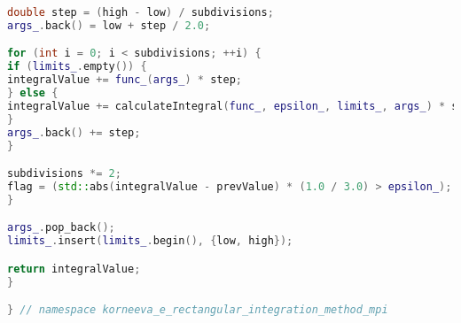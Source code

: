 \documentclass[12pt]{article}
\begin{document}
\begin{lstlisting}[language=C++]
double step = (high - low) / subdivisions;
args_.back() = low + step / 2.0;

for (int i = 0; i < subdivisions; ++i) {
if (limits_.empty()) {
integralValue += func_(args_) * step;
} else {
integralValue += calculateIntegral(func_, epsilon_, limits_, args_) * step;
}
args_.back() += step;
}

subdivisions *= 2;
flag = (std::abs(integralValue - prevValue) * (1.0 / 3.0) > epsilon_);
}

args_.pop_back();
limits_.insert(limits_.begin(), {low, high});

return integralValue;
}

} // namespace korneeva_e_rectangular_integration_method_mpi
\end{lstlisting}
\end{document}
